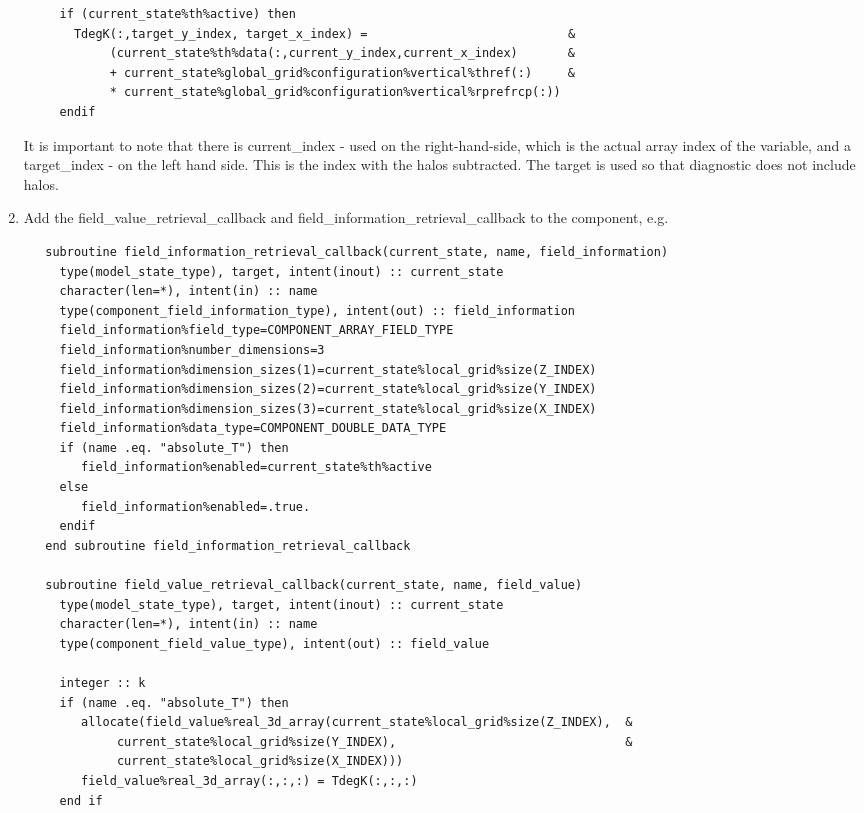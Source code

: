 \documentclass[a4paper,11pt]{article}
\begin{document}
\begin{enumerate}
{\begin{lstlisting}
     if (current_state%th%active) then
       TdegK(:,target_y_index, target_x_index) =                            &
            (current_state%th%data(:,current_y_index,current_x_index)       &
            + current_state%global_grid%configuration%vertical%thref(:)     &
            * current_state%global_grid%configuration%vertical%rprefrcp(:))
     endif
   \end{lstlisting}
   It is important to note that there is current\_index - used on the right-hand-side,
   which is the actual array index of the variable, and a target\_index - on the
   left hand side. This is the index with the halos subtracted. The target\index
   is used so that diagnostic does not include halos.
   }
   \item{Add the field\_value\_retrieval\_callback and
   field\_information\_retrieval\_callback to the component, e.g.
   \begin{lstlisting}
   subroutine field_information_retrieval_callback(current_state, name, field_information)
     type(model_state_type), target, intent(inout) :: current_state
     character(len=*), intent(in) :: name
     type(component_field_information_type), intent(out) :: field_information
     field_information%field_type=COMPONENT_ARRAY_FIELD_TYPE
     field_information%number_dimensions=3
     field_information%dimension_sizes(1)=current_state%local_grid%size(Z_INDEX)
     field_information%dimension_sizes(2)=current_state%local_grid%size(Y_INDEX)
     field_information%dimension_sizes(3)=current_state%local_grid%size(X_INDEX)
     field_information%data_type=COMPONENT_DOUBLE_DATA_TYPE
     if (name .eq. "absolute_T") then
        field_information%enabled=current_state%th%active
     else
        field_information%enabled=.true.
     endif
   end subroutine field_information_retrieval_callback

   subroutine field_value_retrieval_callback(current_state, name, field_value)
     type(model_state_type), target, intent(inout) :: current_state
     character(len=*), intent(in) :: name
     type(component_field_value_type), intent(out) :: field_value

     integer :: k
     if (name .eq. "absolute_T") then
        allocate(field_value%real_3d_array(current_state%local_grid%size(Z_INDEX),  &
             current_state%local_grid%size(Y_INDEX),                                &
             current_state%local_grid%size(X_INDEX)))
        field_value%real_3d_array(:,:,:) = TdegK(:,:,:)
     end if


\end{lstlisting}}
\end{enumerate}
\end{document}
